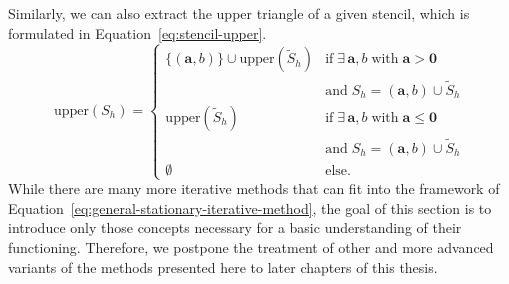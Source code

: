 Similarly, we can also extract the upper triangle of a given stencil, which is formulated in Equation~\eqref{eq:stencil-upper}.
\begin{equation}
	\text{upper}(S_h) = \begin{cases}
		\{(\bm{a}, b) \} \cup \text{upper}(\tilde{S}_h) & \text{if} \; \exists\, \bm a, b \; \text{with} \; \bm a > \bm 0 \\ & \text{and} \; S_h = (\bm a, b) \cup \tilde{S}_h \\
		\text{upper}(\tilde{S}_h) & \text{if} \; \exists\, \bm a, b \; \text{with} \; \bm a \leq \bm 0 \\ & \text{and} \; S_h = (\bm a, b) \cup \tilde{S}_h \\
		\emptyset & \text{else}.
	\end{cases}
	\label{eq:stencil-upper}
\end{equation}
While there are many more iterative methods that can fit into the framework of Equation~\eqref{eq:general-stationary-iterative-method}, the goal of this section is to introduce only those concepts necessary for a basic understanding of their functioning.
Therefore, we postpone the treatment of other and more advanced variants of the methods presented here to later chapters of this thesis.

